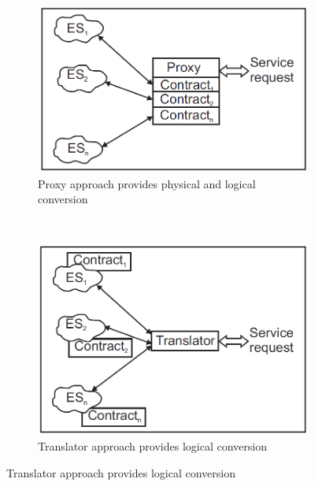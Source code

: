\begin{figure}[h]
        \centering
        \begin{subfigure}[b]{0.3\textwidth}
                \centering
                \includegraphics[width=\textwidth]{../images/implementation/proxy_arch.png}
                \caption{ Proxy approach provides physical and logical
                conversion}
                \label{fig:proxy_arch}
        \end{subfigure}%
        ~ %
        \begin{subfigure}[b]{0.3\textwidth}
                \centering
                \includegraphics[width=\textwidth]{../images/implementation/translator_arch.png}
                \caption{Translator approach provides logical conversion}
                \label{fig:tranlator_arch}

\end{subfigure}
\end{figure}
